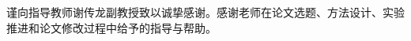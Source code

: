 
\begin{acknowledgements}
谨向指导教师谢传龙副教授致以诚挚感谢。感谢老师在论文选题、方法设计、实验推进和论文修改过程中给予的指导与帮助。
\end{acknowledgements}
